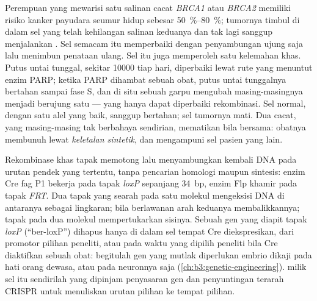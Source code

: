 \begin{example}\label{ex:b3:dna-repair:parp}
Perempuan yang mewarisi satu salinan cacat \emph{BRCA1} atau \emph{BRCA2}
memiliki risiko kanker payudara seumur hidup sebesar \qtyrange{50}{80}{\%};
tumornya timbul di dalam sel yang telah kehilangan salinan keduanya dan tak
lagi sanggup menjalankan . Sel semacam itu memperbaiki
 dengan penyambungan ujung saja lalu menimbun penataan
ulang. Sel itu juga memperoleh satu kelemahan khas. Putus untai tunggal,
sekitar \num{10000} tiap hari, diperbaiki lewat rute yang menuntut enzim PARP;
ketika PARP dihambat sebuah obat, putus untai tunggalnya bertahan sampai fase
S, dan di situ sebuah garpu mengubah masing-masingnya menjadi  berujung satu --- yang hanya dapat diperbaiki rekombinasi. Sel normal,
dengan satu alel \emph{} yang baik, sanggup bertahan; sel tumornya mati.
Dua cacat, yang masing-masing tak berbahaya sendirian, mematikan bila
bersama: obatnya membunuh lewat \emph{keletalan sintetik}, dan mengampuni sel
pasien yang lain.
\end{example}

\begin{proposition}\label{prop:b3:dna-repair:tools}
Rekombinase khas tapak memotong lalu menyambungkan kembali DNA pada urutan
pendek yang tertentu, tanpa pencarian homologi maupun sintesis: enzim Cre
fag P1 bekerja pada tapak \emph{loxP} sepanjang \qty{34}{bp}, enzim Flp khamir
pada tapak \emph{FRT}. Dua tapak yang searah pada satu molekul mengeksisi DNA
di antaranya sebagai lingkaran; bila berlawanan arah keduanya membalikkannya;
tapak pada dua molekul mempertukarkan sisinya. Sebuah gen yang diapit tapak
\emph{loxP} (``ber-loxP'') dihapus hanya di dalam sel tempat Cre
diekspresikan, dari promotor pilihan peneliti, atau pada waktu yang dipilih
peneliti bila Cre diaktifkan sebuah obat: begitulah gen yang mutlak
diperlukan embrio dikaji pada hati orang dewasa, atau pada neuronnya saja
(\cref{ch:b3:genetic-engineering}).  milik sel itu
sendirilah yang dipinjam penyasaran gen dan penyuntingan terarah CRISPR untuk
menuliskan urutan pilihan ke tempat pilihan.
\end{proposition}

